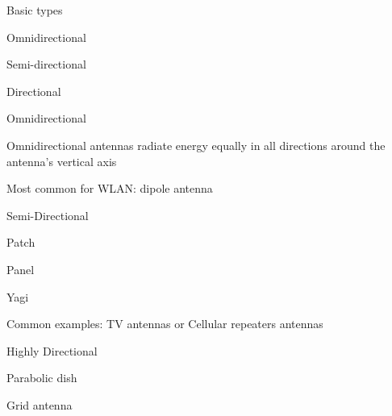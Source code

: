 \documentclass[9pt]{article}
\begin{document}
\begin{slide}
\begin{picture}
\end{picture}
\bi
	\item Basic types
	\bi
		\item Omnidirectional
		\item Semi-directional
		\item Directional
	\ei
	\item Omnidirectional
	\bi
		\item Omnidirectional antennas radiate energy equally in  all directions around the antenna's vertical axis
		\item Most common for WLAN: dipole antenna
	\ei
	\item Semi-Directional
	\bi
		\item Patch
		\item Panel
		\item Yagi
		\item Common examples: TV antennas or Cellular repeaters antennas
	\ei
	\item Highly Directional
	\bi
		\item Parabolic dish
		\item Grid antenna
	\ei
\ei
\end{slide}
\end{document}
